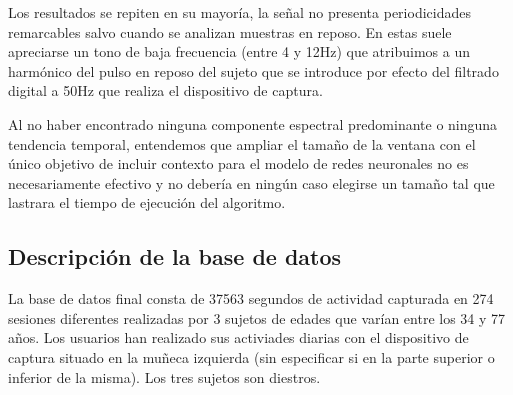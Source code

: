 Los resultados se repiten en su mayoría, la señal no presenta periodicidades remarcables salvo cuando se analizan muestras en reposo. En estas suele apreciarse un tono de baja frecuencia (entre 4 y 12Hz) que atribuimos a un harmónico del pulso en reposo del sujeto que se introduce por efecto del filtrado digital a 50Hz que realiza el dispositivo de captura.

Al no haber encontrado ninguna componente espectral predominante o ninguna tendencia temporal, entendemos que ampliar el tamaño de la ventana con el único objetivo de incluir contexto para el modelo de redes neuronales no es necesariamente efectivo y no debería en ningún caso elegirse un tamaño tal que lastrara el tiempo de ejecución del algoritmo.

\subsection{Descripción de la base de datos}

La base de datos final consta de 37563 segundos de actividad capturada en 274 sesiones diferentes realizadas por 3 sujetos de edades que varían entre los 34 y 77 años. Los usuarios han realizado sus activiades diarias con el dispositivo de captura situado en la muñeca izquierda (sin especificar si en la parte superior o inferior de la misma). Los tres sujetos son diestros.



